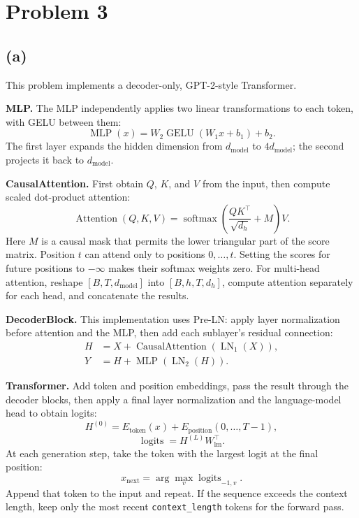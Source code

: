 \documentclass[a4paper,10pt]{article}
\begin{document}
\section{Problem 3}

\subsection{(a)}
This problem implements a decoder-only, GPT-2-style Transformer.

\noindent\textbf{MLP.} The MLP independently applies two linear transformations to each token, with GELU between them:
\[
\operatorname{MLP}(x)=W_2\operatorname{GELU}(W_1x+b_1)+b_2.
\]
The first layer expands the hidden dimension from \(d_{\text{model}}\) to \(4d_{\text{model}}\); the second projects it back to \(d_{\text{model}}\).

\noindent\textbf{CausalAttention.} First obtain \(Q\), \(K\), and \(V\) from the input, then compute scaled dot-product attention:
\[
\operatorname{Attention}(Q,K,V)=
\operatorname{softmax}\left(\frac{QK^\top}{\sqrt{d_h}}+M\right)V.
\]
Here \(M\) is a causal mask that permits the lower triangular part of the score matrix. Position \(t\) can attend only to positions \(0,\ldots,t\). Setting the scores for future positions to \(-\infty\) makes their softmax weights zero. For multi-head attention, reshape \([B,T,d_{\text{model}}]\) into \([B,h,T,d_h]\), compute attention separately for each head, and concatenate the results.

\noindent\textbf{DecoderBlock.} This implementation uses Pre-LN: apply layer normalization before attention and the MLP, then add each sublayer's residual connection:
\[
\begin{aligned}
H &= X+\operatorname{CausalAttention}(\operatorname{LN}_1(X)),\\
Y &= H+\operatorname{MLP}(\operatorname{LN}_2(H)).
\end{aligned}
\]

\noindent\textbf{Transformer.} Add token and position embeddings, pass the result through the decoder blocks, then apply a final layer normalization and the language-model head to obtain logits:
\[
H^{(0)}=E_{\text{token}}(x)+E_{\text{position}}(0,\ldots,T-1),
\]
\[
\operatorname{logits}=H^{(L)}W_{\text{lm}}^\top.
\]
At each generation step, take the token with the largest logit at the final position:
\[
x_{\text{next}}=\arg\max_v\operatorname{logits}_{-1,v}.
\]
Append that token to the input and repeat. If the sequence exceeds the context length, keep only the most recent \texttt{context\_length} tokens for the forward pass.
\end{document}
